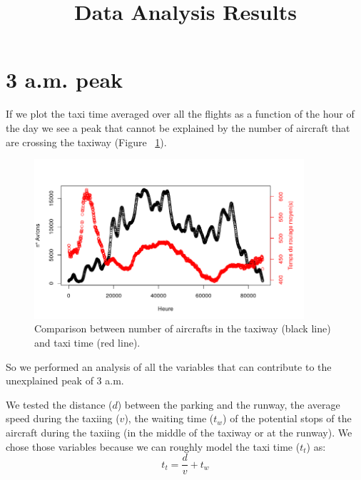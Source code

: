 \documentclass{article}
\begin{document}
	
	\title{Data Analysis Results}
	\maketitle
\section*{3 a.m. peak}

If we plot the taxi time averaged over all the flights as a function of the hour of the day we see a peak that cannot be explained by the number of aircraft that are crossing the taxiway (Figure ~\ref{n_avions}).

\begin{figure}[h]
	\centering
	\includegraphics[width=10cm]{n_avions_TempsRoulage}
	\caption{Comparison between number of aircrafts in the taxiway (black line) and taxi time (red line).}
	\label{n_avions}
\end{figure}
	
So we performed an analysis of all the variables that can contribute to the unexplained peak of 3 a.m.

We tested the distance ($d$) between the parking and the runway, the average speed during the taxiing ($v$), the waiting time ($t_w$) of the potential stops of the aircraft during the taxiing (in the middle of the taxiway or at the runway). We chose those variables because we can roughly model the taxi time ($t_t$) as:
\[t_t = \frac{d}{v} + t_w \]

\newpage
\end{document}
